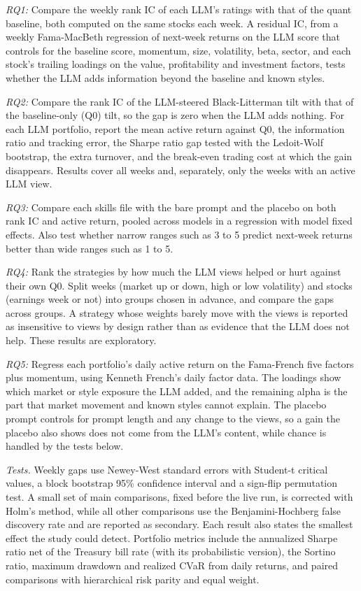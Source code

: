 \documentclass[conference]{IEEEtran}
\begin{document}
\textit{RQ1:} Compare the weekly rank IC of each LLM's ratings with that of the quant baseline, both computed on the same stocks each week. A residual IC, from a weekly Fama-MacBeth regression of next-week returns on the LLM score that controls for the baseline score, momentum, size, volatility, beta, sector, and each stock's trailing loadings on the value, profitability and investment factors, tests whether the LLM adds information beyond the baseline and known styles.

\textit{RQ2:} Compare the rank IC of the LLM-steered Black-Litterman tilt with that of the baseline-only (Q0) tilt, so the gap is zero when the LLM adds nothing. For each LLM portfolio, report the mean active return against Q0, the information ratio and tracking error, the Sharpe ratio gap tested with the Ledoit-Wolf bootstrap, the extra turnover, and the break-even trading cost at which the gain disappears. Results cover all weeks and, separately, only the weeks with an active LLM view.

\textit{RQ3:} Compare each skills file with the bare prompt and the placebo on both rank IC and active return, pooled across models in a regression with model fixed effects. Also test whether narrow ranges such as 3 to 5 predict next-week returns better than wide ranges such as 1 to 5.

\textit{RQ4:} Rank the strategies by how much the LLM views helped or hurt against their own Q0. Split weeks (market up or down, high or low volatility) and stocks (earnings week or not) into groups chosen in advance, and compare the gaps across groups. A strategy whose weights barely move with the views is reported as insensitive to views by design rather than as evidence that the LLM does not help. These results are exploratory.

\textit{RQ5:} Regress each portfolio's daily active return on the Fama-French five factors plus momentum, using Kenneth French's daily factor data. The loadings show which market or style exposure the LLM added, and the remaining alpha is the part that market movement and known styles cannot explain. The placebo prompt controls for prompt length and any change to the views, so a gain the placebo also shows does not come from the LLM's content, while chance is handled by the tests below.

\textit{Tests.} Weekly gaps use Newey-West standard errors with Student-t critical values, a block bootstrap 95\% confidence interval and a sign-flip permutation test. A small set of main comparisons, fixed before the live run, is corrected with Holm's method, while all other comparisons use the Benjamini-Hochberg false discovery rate and are reported as secondary. Each result also states the smallest effect the study could detect. Portfolio metrics include the annualized Sharpe ratio net of the Treasury bill rate (with its probabilistic version), the Sortino ratio, maximum drawdown and realized CVaR from daily returns, and paired comparisons with hierarchical risk parity and equal weight.
\end{document}
